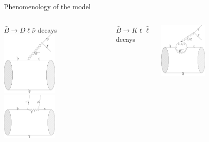 \documentclass[9pt,usenames,dvipsnames]{beamer}
\begin{document}
\begin{frame}{Phenomenology of the model }	
	\begin{columns}[c]
		\begin{center}
			$ \bar B \to D \ell \bar \nu $ decays \\	
			\includegraphics[width= 0.5\textwidth]{./assets/B_to_D_SM} 		\\
			\includegraphics[width= 0.5\textwidth]{./assets/B_to_D_LQ} 	
		\end{center}
		$ \bar B \to K \ell \bar \ell $ decays \\ 
		\begin{center}
			\includegraphics[width= 0.5\textwidth]{./assets/B_to_K_SM} 	\\

\end{center}
\end{columns}
\end{frame}
\end{document}
